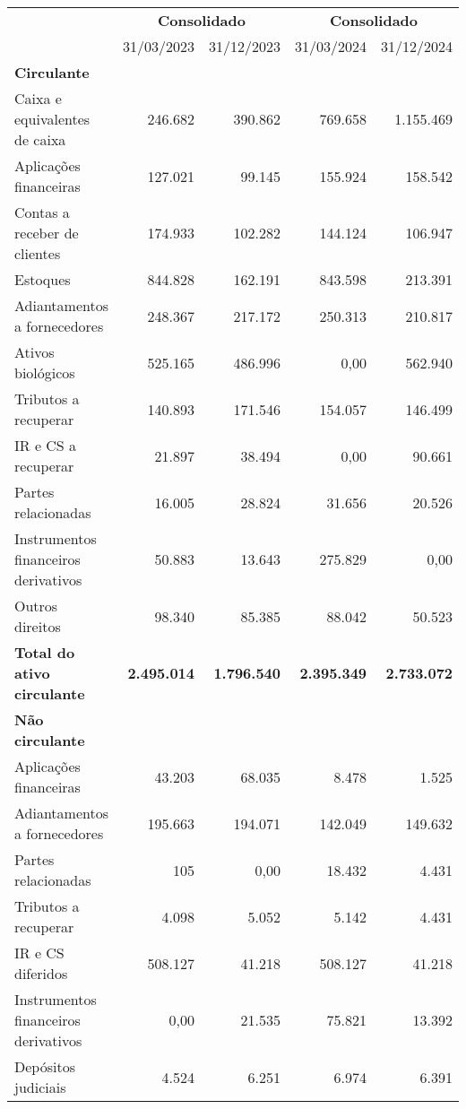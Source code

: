 \documentclass[1pt,a4paper]{article}
\begin{document}
		\begin{longtable}{p{6cm}r r r r }
			\toprule
			& \multicolumn{2}{c}{\textbf{Consolidado}} & \multicolumn{2}{c}{\textbf{Consolidado}} \\
			\cmidrule(lr){2-3} \cmidrule(lr){4-5}
			& 31/03/2023 & 31/12/2023 & 31/03/2024 & 31/12/2024 \\
			\midrule
			\endhead
			\textbf{Circulante} & & & & \\
			Caixa e equivalentes de caixa & 246.682 & 390.862 & 769.658 & 1.155.469 \\
			Aplicações financeiras & 127.021 & 99.145 & 155.924 & 158.542 \\
			Contas a receber de clientes & 174.933 & 102.282 & 144.124 & 106.947 \\
			Estoques & 844.828 & 162.191 & 843.598 & 213.391 \\
			Adiantamentos a fornecedores & 248.367 & 217.172 & 250.313 & 210.817 \\
			Ativos biológicos & 525.165 & 486.996 & 0,00 & 562.940 \\
			Tributos a recuperar & 140.893 & 171.546 & 154.057 & 146.499 \\
			IR e CS a recuperar & 21.897 & 38.494 & 0,00 & 90.661 \\
			Partes relacionadas & 16.005 & 28.824 & 31.656 & 20.526 \\
			Instrumentos financeiros derivativos & 50.883 & 13.643 & 275.829 & 0,00 \\
			Outros direitos & 98.340 & 85.385 & 88.042 & 50.523 \\
			\rowcolor{darkgray}\textbf{Total do ativo circulante} & \textbf{2.495.014} & \textbf{1.796.540} & \textbf{2.395.349} & \textbf{2.733.072} \\
			\midrule
			\textbf{Não circulante} & & & & \\
			Aplicações financeiras & 43.203 & 68.035& 8.478 & 1.525 \\
			Adiantamentos a fornecedores & 195.663 & 194.071 & 142.049 & 149.632 \\
			Partes relacionadas & 105 & 0,00 & 18.432 & 4.431 \\
			Tributos a recuperar & 4.098 & 5.052 & 5.142 & 4.431 \\
			IR e CS diferidos & 508.127 & 41.218 & 508.127 & 41.218 \\
			Instrumentos financeiros derivativos & 0,00 & 21.535 & 75.821 & 13.392 \\
			Depósitos judiciais & 4.524 & 6.251 & 6.974 & 6.391 \\

\end{longtable}
\end{document}

